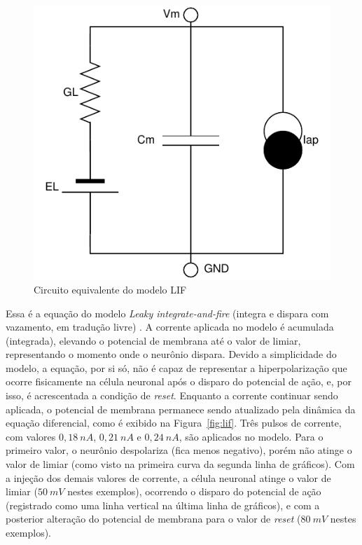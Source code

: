 \begin{figure}[htb!]
	\centering
	\caption{Circuito equivalente do modelo LIF}
	\label{fig:circuitolif}
	\includegraphics[width=0.5\linewidth]{figs/circuito_lif}
\end{figure}
Essa é a equação do modelo \textit{Leaky integrate-and-fire} (integra e dispara com vazamento, em tradução livre) \cite{lapicque_recherches_1907}. A corrente aplicada no modelo é acumulada (integrada), elevando o potencial de membrana até o valor de limiar, representando o momento onde o neurônio dispara. Devido a simplicidade do modelo, a equação, por si só, não é capaz de representar a hiperpolarização que ocorre fisicamente na célula neuronal após o disparo do potencial de ação, e, por isso, é acrescentada a condição de \textit{reset}. Enquanto a corrente continuar sendo aplicada, o potencial de membrana permanece sendo atualizado pela dinâmica da equação diferencial, como é exibido na Figura~\ref{fig:lif}. Três pulsos de corrente, com valores $0,18\ nA$, $0,21\ nA$ e $0,24\ nA$, são aplicados no modelo. Para o primeiro valor, o neurônio despolariza (fica menos negativo), porém não atinge o valor de limiar (como visto na primeira curva da segunda linha de gráficos). Com a injeção dos demais valores de corrente, a célula neuronal atinge o valor de limiar ($50\ mV$ nestes exemplos), ocorrendo o disparo do potencial de ação (registrado como uma linha vertical na última linha de gráficos), e com a posterior alteração do potencial de membrana para o valor de \textit{reset} ($80\ mV$ nestes exemplos).

